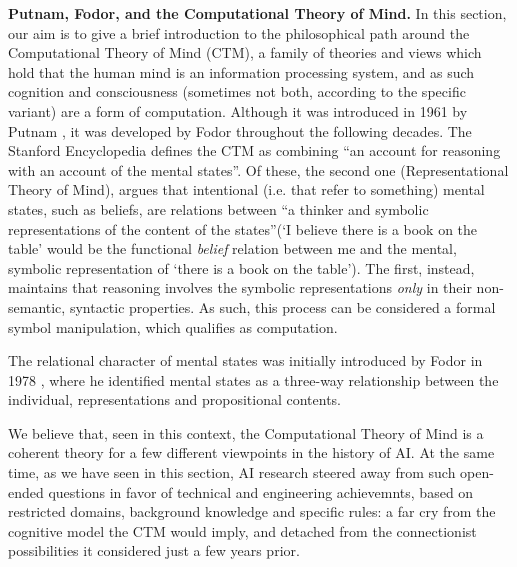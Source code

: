 \documentclass[../main.tex]{subfiles}
\begin{document}
\vspace{4pt}
\textbf{Putnam, Fodor, and the Computational Theory of Mind.}
In this section, our aim is to give a brief introduction to the philosophical path around the Computational Theory of Mind (CTM), a family of theories and views which hold that the human mind is an information processing system, and as such cognition and consciousness (sometimes not both, according to the specific variant) are a form of computation. Although it was introduced in 1961 by Putnam  \parencite{horstComputationalTheoryMind2003}, it was developed by Fodor throughout the following decades. The Stanford Encyclopedia defines the CTM as combining ``an account for reasoning with an account of the mental states''. Of these, the second one (Representational Theory of Mind), argues that intentional (i.e. that refer to something) mental states, such as beliefs, are relations between ``a thinker and symbolic representations of the content of the states''(`I believe there is a book on the table' would be the functional \textit{belief} relation between me and the mental, symbolic representation of `there is a book on the table'). The first, instead, maintains that reasoning involves the symbolic representations \textit{only} in their non-semantic, syntactic properties. As such, this process can be considered a formal symbol manipulation, which qualifies as computation.

The relational character of mental states was initially introduced by Fodor in 1978 \parencite{fodorPropositionalAttitudes1978}, where he identified mental states as a three-way relationship between the individual, representations and propositional contents.

\vspace{5pt}
We believe that, seen in this context, the Computational Theory of Mind is a coherent theory for a few different viewpoints in the history of AI. At the same time, as we have seen in this section, AI research steered away from such open-ended questions in favor of technical and engineering achievemnts, based on restricted domains, background knowledge and specific rules: a far cry from the cognitive model the CTM would imply, and detached from the connectionist possibilities it considered just a few years prior.
\end{document}
